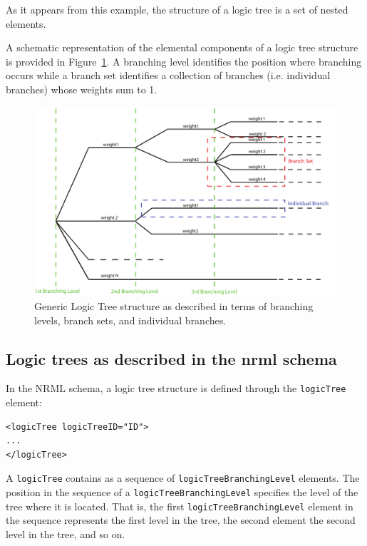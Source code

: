 As it appears from this example, the structure of a logic tree is a set of
nested elements.

A schematic representation of the elemental components of a logic tree
structure is provided in Figure~\ref{glts}. A branching level identifies the
position where branching occurs while  a branch set identifies a collection of
branches (i.e. individual branches)  whose weights sum to 1.

\begin{figure}[!ht]
\centering
\includegraphics[width=13cm]{figures/hazard/GenericLogicTreeStructure.pdf}
\caption{Generic Logic Tree structure as described in terms of branching
levels, branch sets, and individual branches.}
\label{glts}
\end{figure}

\subsection{Logic trees as described in the nrml schema}

In the NRML schema, a logic tree structure is defined through the
\Verb+logicTree+ element:

\begin{verbatim}
<logicTree logicTreeID="ID">
...
</logicTree>
\end{verbatim}

A \Verb+logicTree+ contains as a sequence of \Verb+logicTreeBranchingLevel+ elements. The position in the sequence of a \Verb+logicTreeBranchingLevel+ specifies the level of the tree where it is located. That is, the first \texttt{logicTreeBranchingLevel} element in the sequence represents  the first level in the tree, the second element the second level in the tree, and so on.

